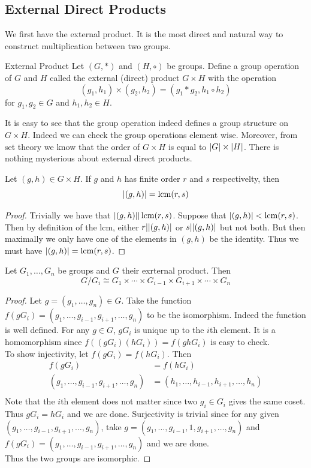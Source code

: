 \documentclass[a4paper]{article}
\begin{document}
\subsection{External Direct Products}
We first have the external product. It is the most direct and natural way to construct multiplication between two groups. 

\begin{defn}{External Product}{} Let $(G,\ast)$ and $(H,\circ)$ be groups. Define a group operation of $G$ and $H$ called the external (direct) product $G\times H$ with the operation $$(g_1,h_1)\times(g_2,h_2)=(g_1\ast g_2,h_1\circ h_2)$$ for $g_1,g_2\in G$ and $h_1,h_2\in H$. 
\end{defn}

It is easy to see that the group operation indeed defines a group structure on $G\times H$. Indeed we can check the group operations element wise. Moreover, from set theory we know that the order of $G\times H$ is equal to $\abs{G}\times\abs{H}$. There is nothing mysterious about external direct products. 

\begin{thm}{}{} Let $(g,h)\in G\times H$. If $g$ and $h$ has finite order $r$ and $s$ respectivelty, then $$\abs{(g,h)}=\operatorname{lcm}(r,s)$$ 
\begin{proof}
Trivially we have that $\abs{(g,h)}|\operatorname{lcm}(r,s)$. Suppose that $\abs{(g,h)}<\operatorname{lcm}(r,s)$. Then by definition of the lcm, either $r|\abs{(g,h)}$ or $s|\abs{(g,h)}$ but not both. But then maximally we only have one of the elements in $(g,h)$ be the identity. Thus we must have $\abs{(g,h)}=\operatorname{lcm}(r,s)$. 
\end{proof}
\end{thm}

\begin{prp}{}{} Let $G_1,\dots, G_n$ be groups and $G$ their exrternal product. Then $$G/G_i\cong G_1\times\cdots \times G_{i-1}\times G_{i+1}\times\cdots\times G_n$$
\begin{proof}
Let $g=(g_1,\dots,g_n)\in G$. Take the function $f(gG_i)=(g_1,\dots,g_{i-1},g_{i+1},\dots,g_n)$ to be the isomorphism. Indeed the function is well defined. For any $g\in G$, $gG_i$ is unique up to the $i$th element. It is a homomorphism since $f((gG_i)(hG_i))=f(ghG_i)$ is easy to check. \\
To show injectivity, let $f(gG_i)=f(hG_i)$. Then
\begin{align*}
f(gG_i)&=f(hG_i)\\
(g_1,\dots,g_{i-1},g_{i+1},\dots,g_n)&=(h_1,\dots,h_{i-1},h_{i+1},\dots,h_n)\\
\end{align*}
Note that the $i$th element does not matter since two $g_i\in G_i$ gives the same coset. Thus $gG_i=hG_i$ and we are done. Surjectivity is trivial since for any given $(g_1,\dots,g_{i-1},g_{i+1},\dots,g_n)$, take $g=(g_1,\dots,g_{i-1},1,g_{i+1},\dots,g_n)$ and $f(gG_i)=(g_1,\dots,g_{i-1},g_{i+1},\dots,g_n)$ and we are done. \\
Thus the two groups are isomorphic. 
\end{proof}
\end{prp}
\end{document}
